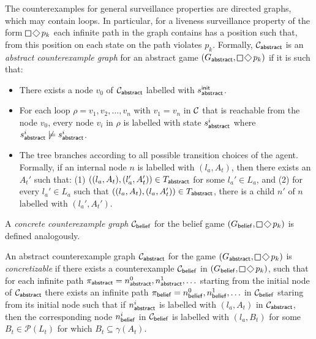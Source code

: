 The counterexamples for general surveillance properties are directed graphs, which may contain loops. In particular, for a liveness surveillance property of the form $\LTLglobally\LTLfinally p_k$ each infinite path in the graph contains has a position such that, from this position on each state on the path violates $p_k$. Formally, $\mathcal{C}_{\mathsf{abstract}}$ is an \emph{abstract counterexample graph} for an abstract game $(G_\abstr,\LTLglobally\LTLfinally p_k)$ if it is such that:
\begin{itemize}
\item There exists a node $v_0$ of $\mathcal{C}_{\mathsf{abstract}}$ labelled with $s^{\mathsf{init}}_{\mathsf{abstract}}$.
\item For each loop $\rho = v_1,v_2,\ldots,v_n$ with $v_1 = v_n$ in $\mathcal{C}$ that is reachable from the node $v_0$, every node $v_i$ in $\rho$ is labelled with state $s_{\mathsf{abstract}}^i$ where $s_{\mathsf{abstract}}^i \not\models s_{\mathsf{abstract}}^i$.
\item The tree branches according to all possible transition choices of the agent. Formally, if an internal node $n$ is labelled with $(l_a,A_t)$, then there exists an $A_t'$  such that: (1) $((l_a,A_t),(l_a',A_t')) \in T_{\mathsf{abstract}}$ for some $l_a' \in L_a$, and (2) for every $l_a' \in L_a$ such that $((l_a,A_t),(l_a,A_t')) \in T_{\mathsf{abstract}}$, there is a child $n'$ of $n$ labelled with $(l_a',A_t')$.
\end{itemize}   

\begin{example}
\end{example}

A \emph{concrete counterexample graph} $\mathcal{C}_{\mathsf{belief}}$ for the belief game $(G_\belief,\LTLglobally\LTLfinally p_k)$ is defined analogously. 

An abstract counterexample graph $\mathcal{C}_{\mathsf{abstract}}$ for the game $(G_\abstr,\LTLglobally\LTLfinally p_k)$ is \emph{concretizable} if there exists a counterexample
$\mathcal{C}_{\mathsf{belief}}$ in $(G_\belief,\LTLglobally \LTLfinally p_k)$, such that for each infinite path $\pi_{\mathsf{abstract}} = n_{\mathsf{abstract}}^0,n_{\mathsf{abstract}}^1,\ldots$ starting from the initial node of $\mathcal{C}_{\mathsf{abstract}}$ there exists an infinite path $\pi_{\mathsf{belief}} = n_{\mathsf{belief}}^0,n_{\mathsf{belief}}^1,\ldots$ in $\mathcal{C}_{\mathsf{belief}}$ staring from its initial node such that if $n_{\mathsf{abstract}}^i$ is labelled with $(l_a,A_t)$ in $\mathcal{C}_{\mathsf{abstract}}$, then the corresponding node $n_{\mathsf{belief}}^i$ in $\mathcal{C}_{\mathsf{belief}}$ is labelled with $(l_a,B_t)$ for some $B_t \in \mathcal{P}(L_t)$ for which $B_t \subseteq \gamma(A_t)$.

